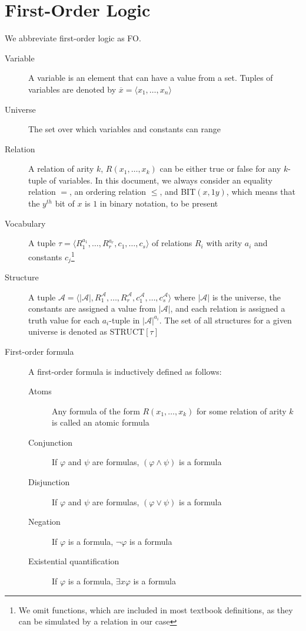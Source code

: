 \section{First-Order Logic}\label{sec:first-order-logic}
We abbreviate first-order logic as FO\@. %
\begin{description}
    \item[Variable] A variable is an element that can have a value from a set.
    Tuples of variables are denoted by $\overline{x} = \langle x_1, \dots, x_n \rangle$
    \item[Universe] The set over which variables and constants can range
    \item[Relation] A relation of arity $k$, $R(x_1, \dots, x_k)$ can be either true or false for any $k$-tuple of variables.
    In this document, we always consider an equality relation $=$, an ordering relation $\leq$, and BIT$(x, 1y)$, which means that the $y^{th}$ bit of $x$ is $1$ in binary notation, to be present
    \item[Vocabulary] A tuple $\tau = \langle R_1^{a_1}, \dots, R_r^{a_r}, c_1, \dots, c_s \rangle$ of relations $R_i$ with arity $a_i$ and constants $c_j$\footnote{We omit functions, which are included in most textbook definitions, as they can be simulated by a relation in our case}
    \item[Structure] A tuple $\mathcal{A} = \langle |\mathcal{A}|, R_1^{\mathcal{A}}, \dots, R_r^{\mathcal{A}}, c_1^{\mathcal{A}}, \dots, c_s^{\mathcal{A}} \rangle$ where $|\mathcal{A}|$ is the universe, the constants are assigned a value from $|\mathcal{A}|$, and each relation is assigned a truth value for each $a_i$-tuple in $|\mathcal{A}|^{a_i}$.
    The set of all structures for a given universe is denoted as STRUCT$[\tau]$
    \item[First-order formula] A first-order formula is inductively defined as follows:
    \begin{description}
        \item[Atoms] Any formula of the form $R(x_1, \dots, x_k)$ for some relation of arity $k$ is called an atomic formula
        \item[Conjunction] If $\varphi$ and $\psi$ are formulas, $(\varphi \land \psi)$ is a formula
        \item[Disjunction] If $\varphi$ and $\psi$ are formulas, $(\varphi \lor \psi)$ is a formula
        \item[Negation] If $\varphi$ is a formula, $\lnot \varphi$ is a formula
        \item[Existential quantification] If $\varphi$ is a formula, $\exists x \varphi$ is a formula

\end{description}
\end{description}
